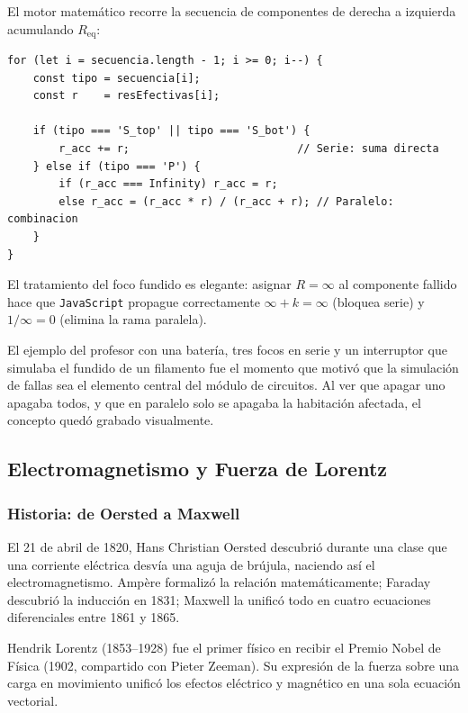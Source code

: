 \documentclass[12pt, a4paper]{article}
\newcommand{\Req}{R_{\mathrm{eq}}}
\begin{document}
El motor matemático recorre la secuencia de componentes de derecha a
izquierda acumulando $\Req$:

\begin{lstlisting}[caption={Nucleo del algoritmo de Req mixto (ModeloCircuitos.js)},
                   label={lst:req_mixto}]
for (let i = secuencia.length - 1; i >= 0; i--) {
    const tipo = secuencia[i];
    const r    = resEfectivas[i];

    if (tipo === 'S_top' || tipo === 'S_bot') {
        r_acc += r;                          // Serie: suma directa
    } else if (tipo === 'P') {
        if (r_acc === Infinity) r_acc = r;
        else r_acc = (r_acc * r) / (r_acc + r); // Paralelo: combinacion
    }
}
\end{lstlisting}

El tratamiento del foco fundido es elegante: asignar $R = \infty$ al
componente fallido hace que \texttt{JavaScript} propague correctamente
$\infty + k = \infty$ (bloquea serie) y $1/\infty = 0$ (elimina la rama
paralela).

\begin{cajaclas}
El ejemplo del profesor con una batería, tres focos en serie y un
interruptor que simulaba el fundido de un filamento fue el momento que
motivó que la simulación de fallas sea el elemento central del módulo de
circuitos. Al ver que apagar uno apagaba todos, y que en paralelo solo se
apagaba la habitación afectada, el concepto quedó grabado visualmente.
\end{cajaclas}

\subsection{Electromagnetismo y Fuerza de Lorentz}

\subsubsection{Historia: de Oersted a Maxwell}

El 21 de abril de 1820, Hans Christian Oersted descubrió durante una clase
que una corriente eléctrica desvía una aguja de brújula, naciendo así el
electromagnetismo. Ampère formalizó la relación matemáticamente; Faraday
descubrió la inducción en 1831; Maxwell la unificó todo en cuatro
ecuaciones diferenciales entre 1861 y 1865.

\begin{cajahist}
Hendrik Lorentz (1853--1928) fue el primer físico en recibir el Premio
Nobel de Física (1902, compartido con Pieter Zeeman). Su expresión de la
fuerza sobre una carga en movimiento unificó los efectos eléctrico y
magnético en una sola ecuación vectorial.
\end{cajahist}
\end{document}
